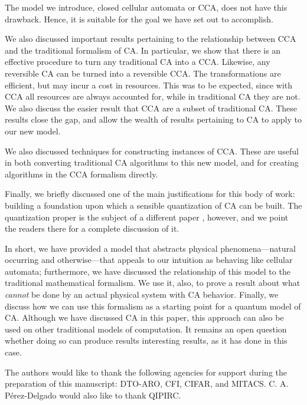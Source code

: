 \documentclass{jca}
\begin{document}
The model we introduce, closed cellular automata or CCA, does not have this drawback.
Hence, it is suitable for the goal we have set out to accomplish. 

We also discussed important results pertaining to the relationship between CCA and the traditional formalism of CA.
In particular, we show that there is an effective procedure to turn any traditional CA into a CCA. 
Likewise, any reversible CA can be turned into a reversible CCA.
The transformations are efficient, but may incur a cost in resources.
This was to be expected, since with CCA all resources are always accounted for, while in traditional CA they are not.
We also discuss the easier result that CCA are a subset of traditional CA.
These results close the gap, and allow the wealth of results pertaining to CA to apply to our new model.

We also discussed techniques for constructing instances of CCA. 
These are useful in both converting traditional CA algorithms to this new model, and for creating algorithms in the CCA formalism directly.

Finally, we briefly discussed one of the main justifications for this body of work: building a foundation upon which a sensible quantization of CA can be built.
The quantization proper is the subject of a different paper \cite{cp07}, however, and we point the readers there for a complete discussion of it.

In short, we have provided a model that abstracts physical phenomena---natural occurring and otherwise---that appeals to our intuition as behaving like cellular automata; furthermore, we have discussed the relationship of this model to the traditional mathematical formalism.
We use it, also, to prove a result about what \emph{cannot} be done by an actual physical system with CA behavior. 
Finally, we discuss how we can use this formalism as a starting point for a quantum model of CA. 
Although we have discussed CA in this paper, this approach can also be used on other traditional models of computation.
It remains an open question whether doing so can produce results interesting results, as it has done in this case.

The authors would like to thank the following agencies for support during the preparation of this manuscript: DTO-ARO, CFI, CIFAR, and MITACS.  C. A. P\'{e}rez-Delgado would also like to thank QIPIRC.


\end{document}
